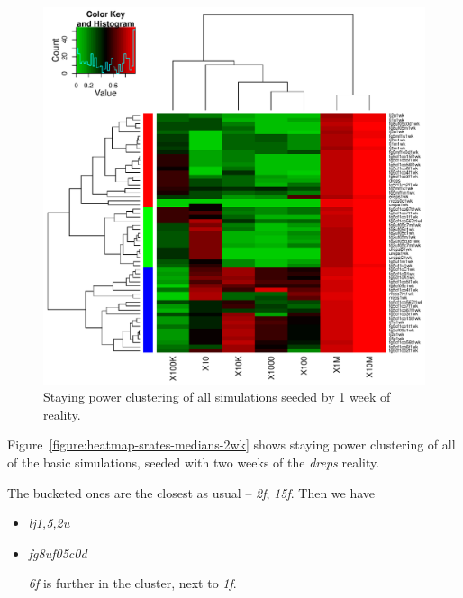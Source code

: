 \documentclass[10pt,oneside]{memoir}
\begin{document}
\begin{Spacing}{2}
\begin{figure}
\begin{center}
    \includegraphics{figures/crop/heatmap-srates-medians-1wk}
    \caption{Staying power clustering of all simulations seeded by 1 week of reality.}
    \label{figure:heatmap-srates-medians-1wk}
\end{center}
\end{figure}
Figure~\ref{figure:heatmap-srates-medians-2wk} shows staying power clustering of all of the basic simulations, seeded with two weeks of the {\itshape dreps} reality.


The bucketed ones are the closest as usual -- {\itshape 2f}, {\itshape 15f}.  Then we have 


\begin{itemize}


\item {\itshape lj{1,5,2}u}

\item {\itshape fg8uf05c0d}


{\itshape 6f} is further in the cluster, next to {\itshape 1f}.



\end{itemize}



\end{Spacing}
\end{document}
